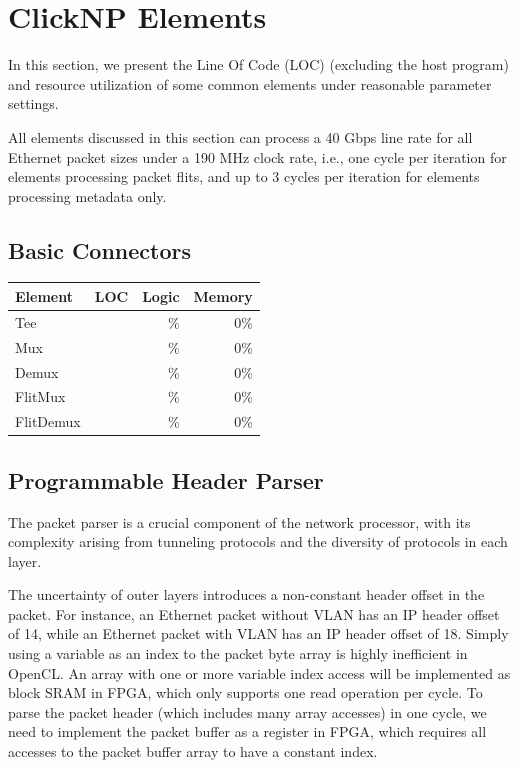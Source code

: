 \section{ClickNP Elements}
\label{clicknp:sec:elements}

In this section, we present the Line Of Code (LOC) (excluding the host program) and resource utilization of some common elements under reasonable parameter settings.

All elements discussed in this section can process a 40 Gbps line rate for all Ethernet packet sizes under a 190 MHz clock rate, i.e., one cycle per iteration for elements processing packet flits, and up to 3 cycles per iteration for elements processing metadata only.

\subsection{Basic Connectors}

\begin{table}[h!]
	\centering
	\label{clicknp:tab:Basic Connectors}
	\begin{tabular}{l|r|r|r}
		Element & LOC & Logic & Memory \\
		\hline
		Tee	&  & \%  & 0\% \\
		Mux	&  & \% & 0\% \\
		Demux & & \% & 0\% \\
		FlitMux & & \% & 0\% \\
		FlitDemux & & \% & 0\% \\
	\end{tabular}
\end{table}


\subsection{Programmable Header Parser}

The packet parser is a crucial component of the network processor, with its complexity arising from tunneling protocols and the diversity of protocols in each layer.

The uncertainty of outer layers introduces a non-constant header offset in the packet. For instance, an Ethernet packet without VLAN has an IP header offset of 14, while an Ethernet packet with VLAN has an IP header offset of 18. Simply using a variable as an index to the packet byte array is highly inefficient in OpenCL. An array with one or more variable index access will be implemented as block SRAM in FPGA, which only supports one read operation per cycle. To parse the packet header (which includes many array accesses) in one cycle, we need to implement the packet buffer as a register in FPGA, which requires all accesses to the packet buffer array to have a constant index.

